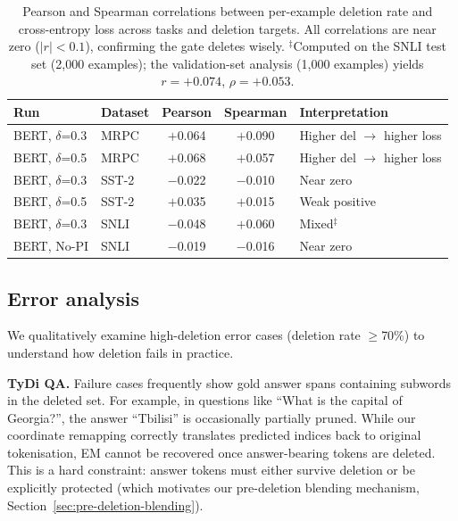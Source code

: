 \documentclass{article} %
\begin{document}
\begin{table}[H]
\centering\small
\begin{tabular}{@{}llcc l@{}}
\toprule
\textbf{Run} & \textbf{Dataset} & \textbf{Pearson} & \textbf{Spearman} & \textbf{Interpretation} \\
\midrule
BERT, $\delta$=0.3   & MRPC   & $+$0.064  & $+$0.090  & Higher del $\to$ higher loss \\
BERT, $\delta$=0.5   & MRPC   & $+$0.068  & $+$0.057  & Higher del $\to$ higher loss \\
BERT, $\delta$=0.3   & SST-2  & $-$0.022  & $-$0.010  & Near zero \\
BERT, $\delta$=0.5   & SST-2  & $+$0.035  & $+$0.015  & Weak positive \\
BERT, $\delta$=0.3   & SNLI   & $-$0.048  & $+$0.060  & Mixed$^\ddagger$ \\
BERT, No-PI           & SNLI   & $-$0.019  & $-$0.016  & Near zero \\
\bottomrule
\end{tabular}
\caption{Pearson and Spearman correlations between per-example deletion rate and cross-entropy loss across tasks and deletion targets. All correlations are near zero ($|r|<0.1$), confirming the gate deletes wisely. $^\ddagger$Computed on the SNLI test set (2,000 examples); the validation-set analysis (1,000 examples) yields $r{=}+0.074$, $\rho{=}+0.053$.}
\label{tab:loss-deletion-corr}
\end{table}


\subsection{Error analysis}
\label{sec:error-analysis}

We qualitatively examine high-deletion error cases (deletion rate $\geq$70\%) to understand how deletion fails in practice.

\textbf{TyDi QA.} Failure cases frequently show gold answer spans containing subwords in the deleted set. For example, in questions like ``What is the capital of Georgia?'', the answer ``Tbilisi'' is occasionally partially pruned. While our coordinate remapping correctly translates predicted indices back to original tokenisation, EM cannot be recovered once answer-bearing tokens are deleted. This is a hard constraint: answer tokens must either survive deletion or be explicitly protected (which motivates our pre-deletion blending mechanism, Section~\ref{sec:pre-deletion-blending}).
\end{document}
